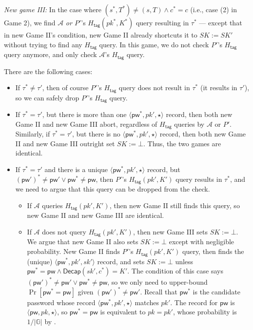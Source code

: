 \documentclass{article}
\theoremstyle{plain}
\theoremstyle{definition}
\theoremstyle{remark}
\newcommand{\group}{\mathbb{G}}
\newcommand{\adv}{\mathcal{A}}
\newcommand{\Decap}{\mathsf{Decap}}
\newcommand{\Htag}{H_\mathsf{tag}}
\newcommand{\pw}{\mathsf{pw}}
\begin{document}
\noindent\emph{New game III:} In the case where $(s^*,T^*) \neq (s,T) \land c^* = c$ (i.e., case (2) in Game 2), we find $\adv$ \emph{or $P'$}'s $\Htag(pk^*,K^*)$ query resulting in $\tau^*$ --- except that in new Game II's condition, new Game II already shortcuts it to $SK := SK'$ without trying to find any $\Htag$ query. In this game, we do not check $P'$'s $\Htag$ query anymore, and only check $\adv$'s $\Htag$ query.

There are the following cases:
\begin{itemize}
  \item If $\tau^* \neq \tau'$, then of course $P'$'s $\Htag$ query does not result in $\tau^*$ (it results in $\tau'$), so we can safely drop $P'$'s $\Htag$ query.
  \item If $\tau^* = \tau'$, but there is more than one $\langle\pw^*,pk',\star\rangle$ record, then both new Game II and new Game III abort, regardless of $\Htag$ queries by $\adv$ or $P'$. Similarly, if $\tau^* = \tau'$, but there is no $\langle\pw^*,pk',\star\rangle$ record, then both new Game II and new Game III outright set $SK := \bot$. Thus, the two games are identical.
  \item If $\tau^* = \tau'$ and there is a unique $\langle\pw^*,pk',\star\rangle$ record, but $(\pw')^* \neq \pw' \lor \pw^* \neq \pw$, then $P'$'s $\Htag(pk',K')$ query results in $\tau^*$, and we need to argue that this query can be dropped from the check.
      \begin{itemize}
        \item If $\adv$ queries $\Htag(pk',K')$, then new Game II still finds this query, so new Game II and new Game III are identical.
        \item If $\adv$ does not query $\Htag(pk',K')$, then new Game III sets $SK := \bot$. We argue that new Game II also sets $SK := \bot$ except with negligible probability. New Game II finds $P'$'s $\Htag(pk',K')$ query, then finds the (unique) $\langle\pw^*,pk',sk'\rangle$ record, and sets $SK := \bot$ unless $\pw^* = \pw \land \Decap(sk',c^*) = K'$. The condition of this case says $(\pw')^* \neq \pw' \lor \pw^* \neq \pw$, so we only need to upper-bound $\Pr[\pw^* = \pw]$ given $(\pw')^* \neq \pw'$. Recall that $\pw^*$ is the candidate password whose record $\langle\pw^*,pk',\star\rangle$ matches $pk'$. The record for $\pw$ is $\langle\pw,pk,\star\rangle$, so $\pw^* = \pw$ is equivalent to $pk = pk'$, whose probability is $1/|\group|$ by .
      \end{itemize}
\end{itemize}
\end{document}
